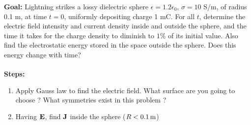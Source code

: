 \documentclass[../../header.tex]{subfiles}
\begin{document}
\textbf{Goal:} Lightning strikes a lossy dielectric sphere $\epsilon=1.2 \epsilon_0$, $\sigma=10$ S/m, of radius 0.1 m, at time $t=0$, uniformly depositing charge 1 mC. 
For all $t$, determine the electric field intensity and current density inside and outside the sphere, and the time it takes for the charge density to diminish to $1\%$ of its initial value. Also find the electrostatic energy stored in the space outside the sphere. Does this energy change with time?\\
\\
\textbf{Steps:} 
\begin{enumerate}
\item Apply Gauss law to find the electric field. What surface are you going to choose ? What
symmetries exist in this problem ? \\

\item Having $\mathbf{E}$, find $\mathbf{J}$ inside the sphere ($R < 0.1\,\text{m}$) \\
 


\end{enumerate}
\end{document}

